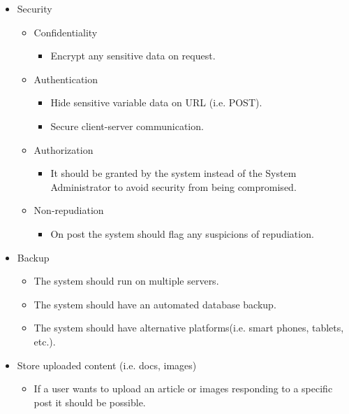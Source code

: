 \begin{itemize}	
		\item Security
			\begin{itemize}
				\item Confidentiality 
					\begin{itemize}
						\item Encrypt any sensitive data on request.  
					\end{itemize}
						
				\item Authentication 
					\begin{itemize}
						\item Hide sensitive variable data on URL (i.e. POST).
						\item Secure client-server communication.   
					\end{itemize}
				
				\item Authorization 
					\begin{itemize}
						\item It should be granted by the system instead of the System Administrator to avoid security from being compromised.    
					\end{itemize}
					
				\item Non-repudiation
					\begin{itemize}
						\item On post the system should flag any suspicions of repudiation.     
					\end{itemize}					
			\end{itemize}
			
		\item Backup
		  \begin{itemize}
			  \item The system should run on multiple servers.
			  \item The system should have an automated database backup.
			  \item The system should have alternative platforms(i.e. smart phones, tablets, etc.).
		  \end{itemize}					
		  
		\item Store uploaded content (i.e. docs, images)
		  \begin{itemize}
			  \item If a user wants to upload an article or images responding to a specific post it should be possible.
		  \end{itemize}					
		
\end{itemize}